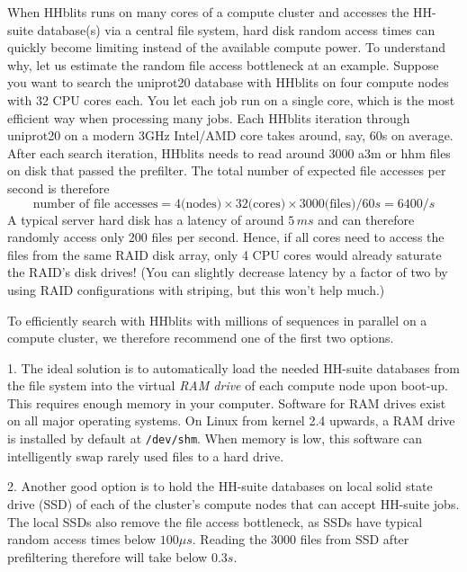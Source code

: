 \documentclass[11pt,a4paper]{article}
\begin{document}
When HHblits runs on many cores of a compute cluster and accesses the HH-suite database(s) 
via a central file system, hard disk random access times can quickly become limiting instead 
of the available compute power. To understand why, let us estimate the random file access 
bottleneck at an example. Suppose you want to search the uniprot20 database with HHblits 
on four compute nodes with 32 CPU cores each. You let each job run on a single core, 
which is the most efficient way when processing many jobs. Each HHblits iteration through 
uniprot20 on a modern 3GHz Intel/AMD core takes around, say, 60s on average. After each search iteration, 
HHblits needs to read around $3000$ a3m or hhm files on disk that passed the prefilter. 
The total number of expected file accesses per second is therefore 
\begin{equation}
\textrm{number of file accesses} = 4 \textrm{(nodes)} \times 32 \textrm{(cores)} \times 3000 \textrm{(files)} / 60s = 6400/s
\end{equation}
A typical server hard disk has a latency of around $5\,ms$ and can therefore randomly access 
only 200 files per second. Hence, if all cores need to access the files from the same RAID 
disk array, only 4 CPU cores would already saturate the RAID's disk drives! (You can slightly 
decrease latency by a factor of two by using RAID configurations with striping, but this 
won't help much.)

To efficiently search with HHblits with millions of sequences in parallel on a compute cluster, 
we therefore recommend one of the first two options.

1. The ideal solution is to automatically load the needed HH-suite databases from the 
file system into the virtual {\it RAM drive} of each compute node upon boot-up. This requires 
enough memory in your computer. Software for RAM drives exist on all major operating systems. 
On Linux from kernel 2.4 upwards, a RAM drive is installed by default at \verb`/dev/shm`. When 
memory is low, this software can intelligently swap rarely used files to a hard drive. 

2. Another good option is to hold the HH-suite databases on local solid state drive (SSD) 
of each of the cluster's compute nodes that can accept HH-suite jobs. The local SSDs also 
remove the file access bottleneck, as SSDs have typical random access times below 
$100 \mu s$. Reading the 3000 files from SSD after prefiltering therefore will take below $0.3 s$.
\end{document}
